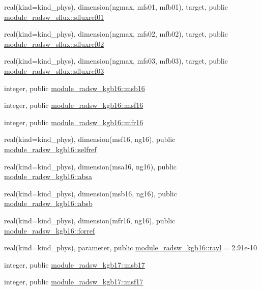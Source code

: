 \begin{DoxyCompactItemize}
\item 
real(kind=kind\+\_\+phys), dimension(ngmax, mfs01, mfb01), target, public \hyperlink{group__module__radsw__main_ga84205f359fb3e1a0e1d03e755c52dc78}{module\+\_\+radsw\+\_\+sflux\+::sfluxref01}
\item 
real(kind=kind\+\_\+phys), dimension(ngmax, mfs02, mfb02), target, public \hyperlink{group__module__radsw__main_gaa57fca862289bd57327b9c3ef27e3e2f}{module\+\_\+radsw\+\_\+sflux\+::sfluxref02}
\item 
real(kind=kind\+\_\+phys), dimension(ngmax, mfs03, mfb03), target, public \hyperlink{group__module__radsw__main_ga95d2640cf0e6cf0ba4a8ca1758806e48}{module\+\_\+radsw\+\_\+sflux\+::sfluxref03}
\item 
integer, public \hyperlink{group__module__radsw__main_ga2ce1ab36897fb1fc7d85cbf7fe539e59}{module\+\_\+radsw\+\_\+kgb16\+::msb16}
\item 
integer, public \hyperlink{group__module__radsw__main_gab35df3f7d231e98fbef5738119138907}{module\+\_\+radsw\+\_\+kgb16\+::msf16}
\item 
integer, public \hyperlink{group__module__radsw__main_gaeee3fe8e44f6fbd9a6a008bc9f97f37c}{module\+\_\+radsw\+\_\+kgb16\+::mfr16}
\item 
real(kind=kind\+\_\+phys), dimension(msf16, ng16), public \hyperlink{group__module__radsw__main_ga77d98f3fb766d4abfd494332ce67c2c2}{module\+\_\+radsw\+\_\+kgb16\+::selfref}
\item 
real(kind=kind\+\_\+phys), dimension(msa16, ng16), public \hyperlink{group__module__radsw__main_ga51fe40b5f24cc461850fe5be40d18869}{module\+\_\+radsw\+\_\+kgb16\+::absa}
\item 
real(kind=kind\+\_\+phys), dimension(msb16, ng16), public \hyperlink{group__module__radsw__main_gafe8639128e4f7a48f133b7399addcb79}{module\+\_\+radsw\+\_\+kgb16\+::absb}
\item 
real(kind=kind\+\_\+phys), dimension(mfr16, ng16), public \hyperlink{group__module__radsw__main_ga8e8cf110f56c7d4253c63bbf607be34c}{module\+\_\+radsw\+\_\+kgb16\+::forref}
\item 
real(kind=kind\+\_\+phys), parameter, public \hyperlink{group__module__radsw__main_ga27964e0300eb686acf1ed3c8459d3810}{module\+\_\+radsw\+\_\+kgb16\+::rayl} = 2.\+91e-\/10
\item 
integer, public \hyperlink{group__module__radsw__main_gafbb056103147b8e5f4d5a8af40420ea0}{module\+\_\+radsw\+\_\+kgb17\+::msb17}
\item 
integer, public \hyperlink{group__module__radsw__main_ga6864c3b95515fb2f408e21298da3952f}{module\+\_\+radsw\+\_\+kgb17\+::msf17}

\end{DoxyCompactItemize}
